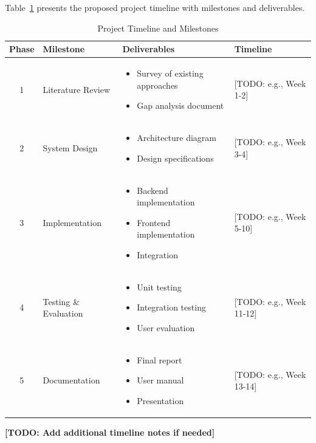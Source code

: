 
Table~\ref{tab:timeline} presents the proposed project timeline with milestones and deliverables.

\begin{table}[H]
\centering
\caption{Project Timeline and Milestones}
\label{tab:timeline}
\begin{tabular}{@{}clp{6cm}l@{}}
\toprule
\textbf{Phase} & \textbf{Milestone} & \textbf{Deliverables} & \textbf{Timeline} \\ \midrule
1 & Literature Review & 
\begin{itemize}
    \item Survey of existing approaches
    \item Gap analysis document
\end{itemize} & [TODO: e.g., Week 1-2] \\ \midrule

2 & System Design & 
\begin{itemize}
    \item Architecture diagram
    \item Design specifications
\end{itemize} & [TODO: e.g., Week 3-4] \\ \midrule

3 & Implementation & 
\begin{itemize}
    \item Backend implementation
    \item Frontend implementation
    \item Integration
\end{itemize} & [TODO: e.g., Week 5-10] \\ \midrule

4 & Testing \& Evaluation & 
\begin{itemize}
    \item Unit testing
    \item Integration testing
    \item User evaluation
\end{itemize} & [TODO: e.g., Week 11-12] \\ \midrule

5 & Documentation & 
\begin{itemize}
    \item Final report
    \item User manual
    \item Presentation
\end{itemize} & [TODO: e.g., Week 13-14] \\ \bottomrule
\end{tabular}
\end{table}


\textbf{[TODO: Add additional timeline notes if needed]}